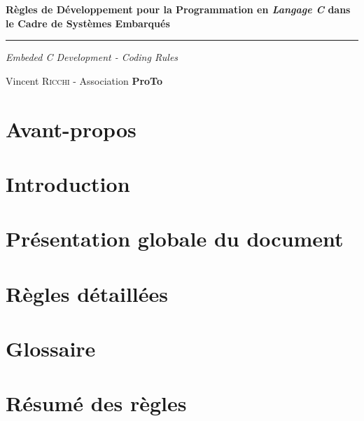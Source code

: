 \documentclass[a4paper, titlepage]{article}
\begin{document}
\begin{titlepage}
  \begin{flushleft}\huge\bfseries
    Règles de Développement pour la Programmation en \textit{Langage C} dans le Cadre de Systèmes Embarqués
  \end{flushleft}
  \hrule
  \begin{flushright}\LARGE
    \textit{Embeded C Development - Coding Rules}
  \end{flushright}
  \begin{center}
    Vincent \textsc{Ricchi} - Association \textbf{ProTo}
  \end{center}
\end{titlepage}


\part*{Avant-propos}


\tableofcontents

\pagebreak

\part{Introduction}


\part{Présentation globale du document}


\part{Règles détaillées}








\appendix

\pagebreak

\part*{Glossaire}


\pagebreak

\part*{Résumé des règles}

\end{document}
